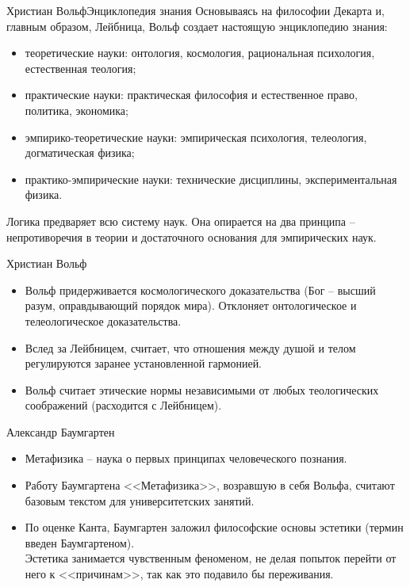 \documentclass{beamer}
\begin{document}
    \begin{frame}{Христиан Вольф}{Энциклопедия знания}
        Основываясь на философии Декарта и, главным образом, Лейбница,
        Вольф создает настоящую энциклопедию знания:
        \begin{itemize}
        \item теоретические науки: онтология, космология,
            рациональная психология, естественная теология;
        \item практические науки: практическая философия и естественное право,
            политика, экономика;
        \item эмпирико-теоретические науки: эмпирическая психология,
            телеология, догматическая физика;
        \item практико-эмпирические науки: технические дисциплины,
            экспериментальная физика.
        \end{itemize}
        Логика предваряет всю систему наук.
        Она опирается на два принципа -- непротиворечия в теории и
        достаточного основания для эмпирических наук.
    \end{frame}

    \begin{frame}{Христиан Вольф}
        \begin{itemize}
        \item Вольф придерживается космологического доказательства
            (Бог -- высший разум, оправдывающий порядок мира).
            Отклоняет онтологическое и телеологическое доказательства.
        \item Вслед за Лейбницем, считает, что отношения между душой и телом
            регулируются заранее установленной гармонией.
        \item Вольф считает этические нормы независимыми от
            любых теологических соображений (расходится с Лейбницем).
        \end{itemize}
    \end{frame}

    \begin{frame}{Александр Баумгартен}
        \begin{itemize}
        \item Метафизика -- наука о первых принципах человеческого познания.
        \item Работу Баумгартена <<Метафизика>>, возравшую в себя Вольфа,
            считают базовым текстом для университетских занятий.
        \item По оценке Канта, Баумгартен заложил философские основы эстетики
            (термин введен Баумгартеном).\\
            Эстетика занимается чувственным феноменом,
            не делая попыток перейти от него к <<причинам>>,
            так как это подавило бы переживания.
        \end{itemize}
    \end{frame}
\end{document}

